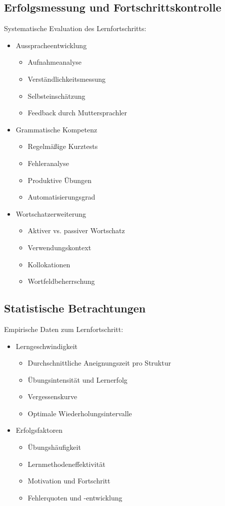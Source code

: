 \subsection{Erfolgsmessung und Fortschrittskontrolle}
Systematische Evaluation des Lernfortschritts:
\begin{itemize}
    \item Ausspracheentwicklung
    \begin{itemize}
        \item Aufnahmeanalyse
        \item Verständlichkeitsmessung
        \item Selbsteinschätzung
        \item Feedback durch Muttersprachler
    \end{itemize}
    
    \item Grammatische Kompetenz
    \begin{itemize}
        \item Regelmäßige Kurztests
        \item Fehleranalyse
        \item Produktive Übungen
        \item Automatisierungsgrad
    \end{itemize}
    
    \item Wortschatzerweiterung
    \begin{itemize}
        \item Aktiver vs. passiver Wortschatz
        \item Verwendungskontext
        \item Kollokationen
        \item Wortfeldbeherrschung
    \end{itemize}
\end{itemize}

\subsection{Statistische Betrachtungen}
Empirische Daten zum Lernfortschritt:
\begin{itemize}
    \item Lerngeschwindigkeit
    \begin{itemize}
        \item Durchschnittliche Aneignungszeit pro Struktur
        \item Übungsintensität und Lernerfolg
        \item Vergessenskurve
        \item Optimale Wiederholungsintervalle
    \end{itemize}
    
    \item Erfolgsfaktoren
    \begin{itemize}
        \item Übungshäufigkeit
        \item Lernmethodeneffektivität
        \item Motivation und Fortschritt
        \item Fehlerquoten und -entwicklung
    \end{itemize}
\end{itemize} 